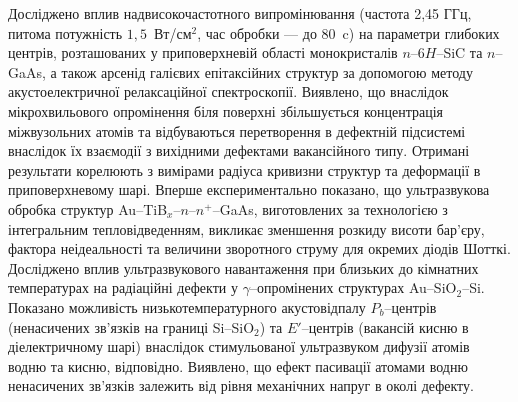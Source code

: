 Досліджено вплив надвисокочастотного випромінювання (частота 2,45 ГГц, питома потужність  $1,5$~Вт/см$^2$, час обробки --- до 80~c) на параметри глибоких центрів, розташованих у приповерхневій області монокристалів $n$--6$H$--SiC та $n$--GaAs, а також арсенід галієвих епітаксійних структур за допомогою методу акустоелектричної релаксаційної спектроскопії.
Виявлено, що внаслідок мікрохвильового опромінення біля поверхні збільшується концентрація міжвузольних атомів та відбуваються перетворення в дефектній підсистемі внаслідок їх взаємодії з вихідними дефектами вакансійного типу.
Отримані результати корелюють з вимірами радіуса кривизни структур та деформації в приповерхневому шарі.
Вперше експериментально показано, що ультразвукова обробка структур
Au--TiB$_x$--$n$--$n^+$--GaAs, виготовлених
за технологією з інтегральним тепловідведенням, викликає зменшення розкиду висоти бар'єру, фактора неідеальності та величини зворотного струму для окремих діодів Шотткі.
Досліджено вплив ультразвукового навантаження при близьких до кімнатних температурах на радіаційні дефекти у $\gamma$--опромінених структурах Au--SiO$_2$--Si.
Показано можливість низькотемпературного акустовідпалу $P_b$--центрів (ненасичених зв'язків на границі Si--SiO$_2$)
та $E'$--центрів (вакансій кисню в діелектричному шарі) внаслідок стимульованої ультразвуком дифузії атомів водню та кисню, відповідно.
Виявлено, що ефект  пасивації атомами водню ненасичених зв'язків залежить
від рівня механічних напруг в околі дефекту.





\vspace{0.7cm}
\noindent
\keywords

\vspace{2cm}




